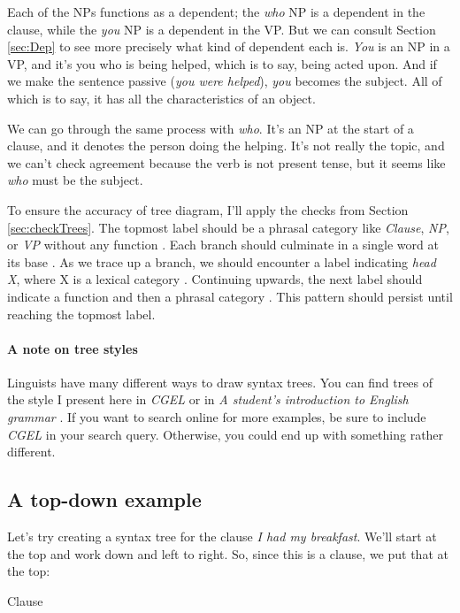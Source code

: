 Each of the NPs functions as a dependent; the \textit{who} NP is a dependent in the clause, while the \textit{you} NP is a dependent in the VP. But we can consult Section \ref{sec:Dep} to see more precisely what kind of dependent each is. \textit{You} is an NP in a VP, and it's you who is being helped, which is to say, being acted upon. And if we make the sentence passive (\textit{you were helped}), \textit{you} becomes the subject. All of which is to say, it has all the characteristics of an object.

We can go through the same process with \textit{who}. It's an NP at the start of a clause, and it denotes the person doing the helping. It's not really the topic, and we can't check agreement because the verb is not present tense, but it seems like \textit{who} must be the subject.

To ensure the accuracy of tree diagram, I'll apply the checks from Section \ref{sec:checkTrees}. The topmost label should be a phrasal category like \textit{Clause}, \textit{NP}, or \textit{VP} without any function . Each branch should culminate in a single word at its base . As we trace up a branch, we should encounter a label indicating \textit{head X}, where X is a lexical category . Continuing upwards, the next label should indicate a function and then a phrasal category . This pattern should persist until reaching the topmost label.

\paragraph*{A note on tree styles}

Linguists have many different ways to draw syntax trees. You can find trees of the style I present here in \textit{CGEL} or in \textit{A student's introduction to English grammar} \citep{huddleston2022}. If you want to search online for more examples, be sure to include \textit{CGEL} in your search query. Otherwise, you could end up with something rather different.

\subsection{A top-down example}

Let's try creating a syntax tree for the clause \textit{I had my breakfast}. We'll start at the top and work down and left to right. So, since this is a clause, we put that at the top:
\par
{
\centering
Clause
\par
}

